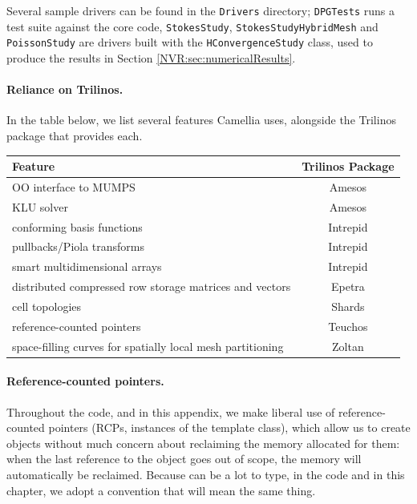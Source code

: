 Several sample drivers can be found in the \verb=Drivers= directory; \verb=DPGTests= runs a test suite against the core code, \verb=StokesStudy=, \verb=StokesStudyHybridMesh= and \verb=PoissonStudy= are drivers built with the \verb=HConvergenceStudy= class, used to produce the results in Section \ref{NVR:sec:numericalResults}.


\paragraph{Reliance on Trilinos.}
In the table below, we list several features Camellia uses, alongside the Trilinos package that provides each.\\
\begin{center}
\begin{tabular}{| l | c |}
\hline
{Feature}			&{Trilinos Package} \\
\hline
OO interface to MUMPS 		&Amesos \\
KLU solver 				&Amesos \\
conforming basis functions	&Intrepid \\
pullbacks/Piola transforms 	&Intrepid \\
smart multidimensional arrays 	&Intrepid \\
distributed compressed row storage matrices and vectors	&Epetra \\
cell topologies 				&Shards \\
reference-counted pointers 				&Teuchos \\
space-filling curves for spatially local mesh partitioning 		&Zoltan \\
\hline
\end{tabular}
\end{center}

\paragraph{Reference-counted pointers.} Throughout the code, and in this appendix, we make liberal use of reference-counted pointers (RCPs, instances of the  template class), which allow us to create objects without much concern about reclaiming the memory allocated for them: when the last reference to the object goes out of scope, the memory will automatically be reclaimed.  Because  can be a lot to type, in the code and in this chapter, we adopt a convention that  will mean the same thing.

